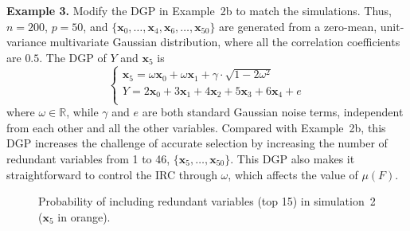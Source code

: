 \documentclass[11pt,review,authoryear]{elsarticle}
\begin{document}
\smallskip
\noindent
\textbf{Example 3.} Modify the DGP in Example~2b to match the \citet{zhaoyu06} simulations. Thus, $n = 200$, $p = 50$, and $\{\mathbf{x}_0, \ldots, \mathbf{x}_4, \mathbf{x}_6, \ldots, \mathbf{x}_{50}\}$ are generated from a zero-mean, unit-variance multivariate Gaussian distribution, where all the correlation coefficients are $0.5$. The DGP of $Y$ and $\mathbf{x}_5$ is
\begin{equation}
	\begin{cases}
    \mathbf{x}_5 = \omega \mathbf{x}_0 + \omega \mathbf{x}_1 + \gamma\cdot \sqrt{1 - 2\omega^2} \\
    Y = 2 \mathbf{x}_0 + 3\mathbf{x}_1 + 4 \mathbf{x}_2 + 5 \mathbf{x}_3 + 6 \mathbf{x}_4 + e \\
	\end{cases}
	\label{eqn:dgp_x5}
\end{equation}
%
where $\omega \in \mathbb{R}$, while $\gamma$ and $e$ are both standard Gaussian noise terms, independent from each other and all the other variables. Compared with Example~2b, this DGP increases the challenge of accurate selection by increasing the number of redundant variables from 1 to 46, $\{\mathbf{x}_5, \ldots, \mathbf{x}_{50}\}$. This DGP also makes it straightforward to control the IRC through $\omega$, which affects the value of $\mu \left( F \right)$.

\begin{figure}
  \centering

  \caption{Probability of including redundant variables (top 15) in simulation~2 ($\mathbf{x}_5$ in orange).}
  \label{fig:solar_ic_type-II}
\end{figure}
\end{document}
